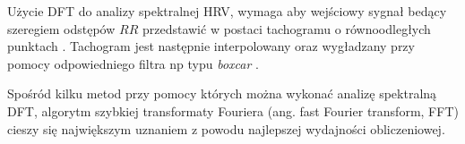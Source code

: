 Użycie DFT do analizy spektralnej HRV, wymaga aby wejściowy sygnał bedący szeregiem odstępów
$RR$ przedstawić w postaci tachogramu o równoodległych punktach \cite{splines}. Tachogram jest następnie
interpolowany oraz wygładzany przy pomocy odpowiedniego filtra np typu \emph{boxcar} \cite{boxcar}.

Spośród kilku metod przy pomocy których można wykonać analizę spektralną DFT,
algorytm szybkiej transformaty Fouriera (ang. fast Fourier transform, FFT) cieszy się
największym uznaniem z powodu najlepszej wydajności obliczeniowej.